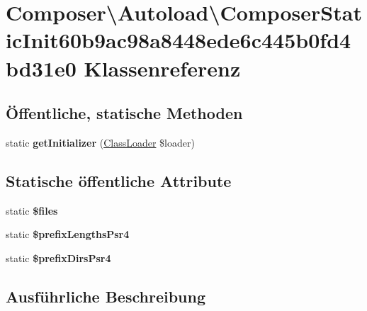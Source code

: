 \hypertarget{class_composer_1_1_autoload_1_1_composer_static_init60b9ac98a8448ede6c445b0fd4bd31e0}{}\section{Composer\textbackslash{}Autoload\textbackslash{}Composer\+Static\+Init60b9ac98a8448ede6c445b0fd4bd31e0 Klassenreferenz}
\label{class_composer_1_1_autoload_1_1_composer_static_init60b9ac98a8448ede6c445b0fd4bd31e0}
\subsection*{Öffentliche, statische Methoden}
\begin{DoxyCompactItemize}
\item 
\mbox{\label{class_composer_1_1_autoload_1_1_composer_static_init60b9ac98a8448ede6c445b0fd4bd31e0_a9efdfd646fc4f0ef3cbeb56717e2f535}} 
static {\bfseries get\+Initializer} (\mbox{\hyperlink{class_composer_1_1_autoload_1_1_class_loader}{Class\+Loader}} \$loader)
\end{DoxyCompactItemize}
\subsection*{Statische öffentliche Attribute}
\begin{DoxyCompactItemize}
\item 
static {\bfseries \$files}
\item 
static {\bfseries \$prefix\+Lengths\+Psr4}
\item 
\mbox{\label{class_composer_1_1_autoload_1_1_composer_static_init60b9ac98a8448ede6c445b0fd4bd31e0_ae0e679ce7d9d6ac13f995be72af0ada5}} 
static {\bfseries \$prefix\+Dirs\+Psr4}
\end{DoxyCompactItemize}


\subsection{Ausführliche Beschreibung}


